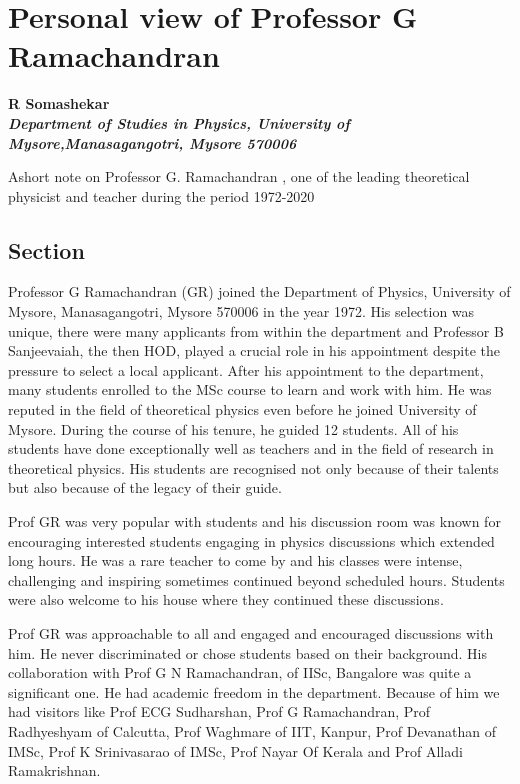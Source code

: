 \chapter{Personal view of Professor G Ramachandran}\label{chap8}


\begin{center}
\textbf{R Somashekar}\\
\textbf{\textit{Department of Studies in Physics, University of Mysore,Manasagangotri, Mysore 570006}}
\end{center}

Ashort note on Professor G. Ramachandran , one of the leading theoretical physicist and teacher during the period 1972-2020

\section{Section}%

Professor G Ramachandran (GR) joined the Department of Physics, University of Mysore, Manasagangotri, Mysore
570006 in the year 1972. His selection was unique, there were many applicants from within the department
and Professor B Sanjeevaiah, the then HOD, played a crucial role in his appointment despite the pressure to
select a local applicant. After his appointment to the department, many students enrolled to the MSc course to
learn and work with him. He was reputed in the field of theoretical physics even before he joined University of
Mysore. During the course of his tenure, he guided 12 students. All of his students have done exceptionally well
as teachers and in the field of research in theoretical physics. His students are recognised not only because of
their talents but also because of the legacy of their guide.

Prof GR was very popular with students and his discussion room was known for encouraging interested students
engaging in physics discussions which extended long hours. He was a rare teacher to come by and his classes were
intense, challenging and inspiring sometimes continued beyond scheduled hours. Students were also welcome to
his house where they continued these discussions.

Prof GR was approachable to all and engaged and encouraged discussions with him. He never discriminated
or chose students based on their background. His collaboration with Prof G N Ramachandran, of IISc, Bangalore was quite a significant one. He had academic freedom in the department. Because of him we had visitors like Prof ECG Sudharshan, Prof G Ramachandran, Prof Radhyeshyam of Calcutta, Prof Waghmare of IIT,
Kanpur, Prof Devanathan of IMSc, Prof K Srinivasarao of IMSc, Prof Nayar Of Kerala and Prof Alladi Ramakrishnan.

